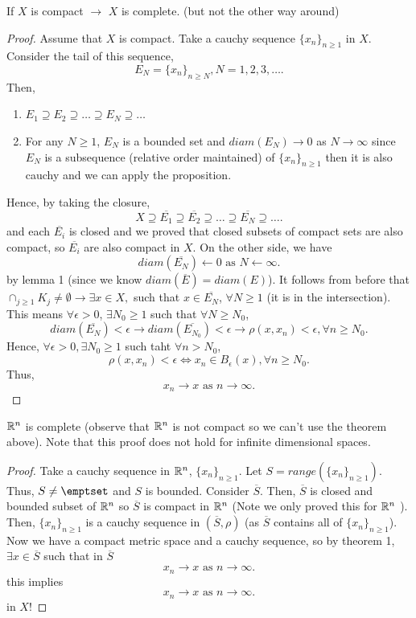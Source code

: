 \documentclass[a4paper]{article}
\begin{document}
\begin{theorem}
  If $X$ is compact  $\to$  $X$ is complete. (but not the other way around)

  \begin{proof}
    Assume that $X$ is compact. Take a cauchy sequence  $\{x_n\}_{n \geq 1} $ in $X$. Consider the tail of this sequence, 
    \[
    E_N = \{x_n\}_{n \geq N}, N = 1,2,3,\ldots 
    .\] 
Then, 
\begin{enumerate}
  \item $E_1 \supseteq E_2 \supseteq \ldots \supseteq E_N \supseteq \ldots$
  \item For any $N \geq 1$,  $E_N$ is a bounded set and  $diam(E_N) \to 0$ as  $N \to \infty$ since  $E_N$ is a subsequence (relative order maintained) of  $\{x_n\}_{n \geq 1} $ then it is also cauchy and we can apply the proposition.
\end{enumerate}
Hence, by taking the closure,
\[
X \supseteq \overline{E_1} \supseteq \overline{E_2} \supseteq \ldots \supseteq \overline{E_N} \supseteq \ldots 
.\] 
and each $\overline{E_i}$ is closed and we proved that closed subsets of compact sets are also compact, so  $\overline{E_i}$ are also compact in  $X$. On the other side, we have
\[
  diam(\overline{E_N}) \leftarrow 0 \text{ as } N \leftarrow \infty
.\] 
by lemma 1 (since we know $diam(\overline{E}) = diam(E)$). It follows from before that $\cap_{j \geq 1} K_j \neq \emptyset \to  \exists x \in X,$ such that $x \in \overline{E_N}$, $\forall N \geq 1$ (it is in the intersection). This means $\forall \epsilon > 0$,  $\exists N_0 \geq 1$ such that $\forall N \geq N_0$, 
\[
diam(\overline{E_N}) < \epsilon \to diam(\overline{E_{N_0}}) < \epsilon \to \rho(x, x_n) < \epsilon,  \forall n \geq N_0
.\] 
Hence, $\forall \epsilon > 0, \exists  N_0 \geq 1$ such taht $\forall n > N_0$,
 \[
\rho(x,x_n) < \epsilon \iff x_n \in B_{\epsilon} (x), \forall n \geq N_0
.\] 
Thus,
\[
  x_n \to x \text{ as } n \to \infty 
.\] 
  \end{proof}
\end{theorem}

\begin{theorem}
  $\mathbb{R}^{n}$ is complete (observe that $\mathbb{R}^{n}$ is not compact so we can't use the theorem above). Note that this proof does not hold for infinite dimensional spaces.

  \begin{proof}
    Take a cauchy sequence in $\mathbb{R}^{n}$, $\{x_n\}_{n \geq 1} $. Let $S = range(\{x_n\}_{n \geq 1})$. Thus, $S \neq \emptset$ and  $S$ is bounded. Consider $\overline{S}$. Then, $\overline{S}$ is closed and bounded subset of $\mathbb{R}^{n}$ so $\overline{S}$ is compact in $\mathbb{R}^{n}$ (Note we only proved this for $\mathbb{R}^{n}$ ). Then, $\{x_{n}\}_{n \geq 1} $ is a cauchy sequence in $(\overline{S}, \rho)$ (as $\overline{S}$ contains all of $\{x_n\}_{n \geq 1} $). Now we have a compact metric space and a cauchy sequence, so by theorem 1, $\exists  x \in \overline{S}$ such that in $\overline{S}$ 
    \[
      x_n \to x \text{ as } n \to \infty 
    .\] 
    this implies
    \[
      x_n \to x \text{ as } n \to \infty
    .\] 
    in $X$!
  \end{proof}
\end{theorem}
\end{document}
